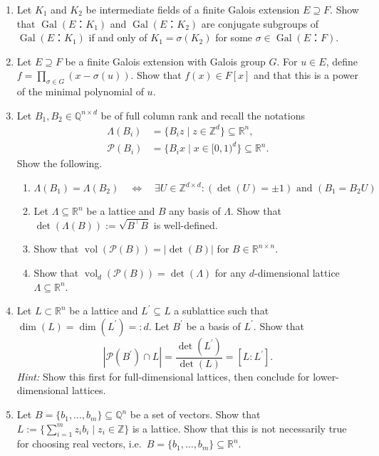 \documentclass[12pt,a4paper]{article}
\def \R {\mathbb R}
\def \Q {\mathbb Q}
\def \Z {\mathbb Z}
\DeclareMathOperator{\vol}{vol}
\DeclareMathOperator{\gal}{Gal}
\begin{document}
 
\begin{enumerate}
\item 
  Let $K_1$ and $K_2$ be intermediate fields of a finite Galois extension $E ⊇F$. Show that $\gal(E：K_1)$ and $\gal(E：K_2)$ are conjugate subgroups of $\gal(E：K_1)$ if and only of $K_1 = σ(K_2)$ for some $σ ∈ \gal(E：F)$.
\item Let $E ⊇F$ be a finite Galois extension with Galois group $G$. For $u ∈E$, define $f = ∏_{σ ∈G} (x - σ(u))$. Show that $f(x) ∈F[x]$ and that this is a power of the minimal polynomial of $u$.

\item Let $B_1, B_2 \in \Q^{n \times d}$ be of full column rank and recall the notations
\begin{align*}
\Lambda(B_i) &= \{ B_i z \mid z \in \Z^d\} \subseteq \R^n, \\
\mathcal{P}(B_i) &= \{B_i x \mid x \in [0,1)^d\} \subseteq \R^n.
\end{align*}
Show the following.
\begin{enumerate}
\item
\[
\Lambda (B_1) = \Lambda (B_2) \quad \Leftrightarrow \quad \exists U \in \Z^{d \times d}: (\det(U) = \pm 1) \text{ and } (B_1 = B_2 U)
\]
\item Let $\Lambda \subseteq \R^n$ be a lattice and $B$ any basis of $\Lambda$.
Show that $\det (\Lambda(B)) := \sqrt{B^\intercal B}$ is well-defined.
\item Show that $\vol(\mathcal{P}(B)) = | \det (B) |$ for $B \in \R^{n \times n}$.
\item Show that $\vol_d(\mathcal{P}(B)) = \det (\Lambda)$ for any $d$-dimensional lattice $\Lambda \subseteq \R^n$.
\end{enumerate}
\item Let $L \subset \R^n$ be a lattice and $L^\prime \subseteq L$ a sublattice such that $\dim(L) = \dim(L^\prime) =: d$.
Let $B^\prime$ be a basis of $L^\prime$.
Show that
\[
 | \mathcal{P}(B^\prime) \cap L | = \frac{\det(L^\prime)}{\det (L)} = [L : L^\prime].
\]
\textit{Hint:} Show this first for full-dimensional lattices, then conclude for lower-dimensional lattices.
\item Let $B = \{ b_1,\dots,b_m\} \subseteq \Q^n$ be a set of vectors.
Show that $L := \{\sum_{i=1}^m z_i b_i \mid z_i \in \Z \}$ is a lattice.
Show that this is not necessarily true for choosing real vectors, i.e.\ $B = \{b_1,\dots,b_m\} \subseteq \R^n$. 


\end{enumerate}
\end{document}
